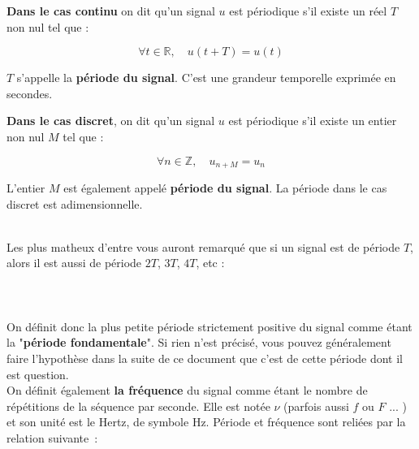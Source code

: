 \begin{minipage}[t]{0.4\textwidth}
\textbf{Dans le cas continu} on dit qu'un signal $u$ est périodique s'il existe un réel $T$ non nul tel que :

\begin{equation}
\forall t \in \mathbb{R}, \quad u(t+T) = u(t)
\end{equation}

$T$ s'appelle la \textbf{période du signal}. C'est une grandeur temporelle exprimée en secondes. \\
\end{minipage}
\hfill \vline \hfill
\begin{minipage}[t]{0.4\textwidth}
\textbf{Dans le cas discret}, on dit qu'un signal $u$ est périodique s'il existe un entier non nul $M$ tel que :

\begin{equation}
	\forall n \in \mathbb{Z}, \quad u_{n+M} = u_{n}
\end{equation}

	L'entier $M$ est également appelé \textbf{période du signal}. La période dans le cas discret est adimensionnelle.
\end{minipage} \\

Les plus matheux d'entre vous auront remarqué que si un signal est de période $T$, alors il est aussi de période $2T$, $3T$, $4T$, etc : \\


 \\

 \\

 \\

On définit donc la plus petite période strictement positive du signal comme étant la "\textbf{période fondamentale}". Si rien n'est précisé, vous pouvez généralement faire l'hypothèse dans la suite de ce document que c'est de cette période dont il est question. \\

On définit également \textbf{la fréquence} du signal comme étant le nombre de répétitions de la séquence par seconde. Elle est notée $\nu$ (parfois aussi $f$ ou $F$ ... ) et son unité est le Hertz, de symbole Hz. Période et fréquence sont reliées par la relation suivante~:

